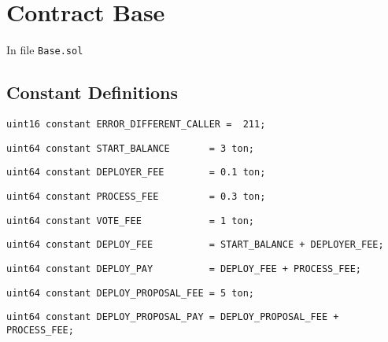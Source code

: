 
\chapter{Contract Base}

\minitoc

In file {\tt Base.sol}

\section{Constant Definitions}


\begin{lstlisting}[firstnumber=8]
    uint16 constant ERROR_DIFFERENT_CALLER =  211;
\end{lstlisting}

\begin{lstlisting}[firstnumber=10]
    uint64 constant START_BALANCE       = 3 ton;
\end{lstlisting}

\begin{lstlisting}[firstnumber=11]
    uint64 constant DEPLOYER_FEE        = 0.1 ton;
\end{lstlisting}

\begin{lstlisting}[firstnumber=12]
    uint64 constant PROCESS_FEE         = 0.3 ton;
\end{lstlisting}

\begin{lstlisting}[firstnumber=13]
    uint64 constant VOTE_FEE            = 1 ton;
\end{lstlisting}

\begin{lstlisting}[firstnumber=14]
    uint64 constant DEPLOY_FEE          = START_BALANCE + DEPLOYER_FEE;
\end{lstlisting}

\begin{lstlisting}[firstnumber=15]
    uint64 constant DEPLOY_PAY          = DEPLOY_FEE + PROCESS_FEE;
\end{lstlisting}

\begin{lstlisting}[firstnumber=16]
    uint64 constant DEPLOY_PROPOSAL_FEE = 5 ton;
\end{lstlisting}

\begin{lstlisting}[firstnumber=17]
    uint64 constant DEPLOY_PROPOSAL_PAY = DEPLOY_PROPOSAL_FEE + PROCESS_FEE;
\end{lstlisting}

